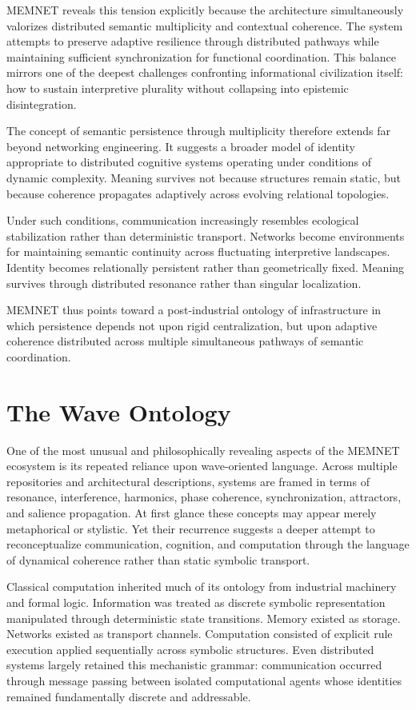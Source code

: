 \documentclass[11pt,a4paper]{article}
\begin{document}
MEMNET reveals this tension explicitly because the architecture simultaneously valorizes distributed semantic multiplicity and contextual coherence. The system attempts to preserve adaptive resilience through distributed pathways while maintaining sufficient synchronization for functional coordination. This balance mirrors one of the deepest challenges confronting informational civilization itself: how to sustain interpretive plurality without collapsing into epistemic disintegration.

The concept of semantic persistence through multiplicity therefore extends far beyond networking engineering. It suggests a broader model of identity appropriate to distributed cognitive systems operating under conditions of dynamic complexity. Meaning survives not because structures remain static, but because coherence propagates adaptively across evolving relational topologies.

Under such conditions, communication increasingly resembles ecological stabilization rather than deterministic transport. Networks become environments for maintaining semantic continuity across fluctuating interpretive landscapes. Identity becomes relationally persistent rather than geometrically fixed. Meaning survives through distributed resonance rather than singular localization.

MEMNET thus points toward a post-industrial ontology of infrastructure in which persistence depends not upon rigid centralization, but upon adaptive coherence distributed across multiple simultaneous pathways of semantic coordination.

\section{The Wave Ontology}

One of the most unusual and philosophically revealing aspects of the MEMNET ecosystem is its repeated reliance upon wave-oriented language. Across multiple repositories and architectural descriptions, systems are framed in terms of resonance, interference, harmonics, phase coherence, synchronization, attractors, and salience propagation. At first glance these concepts may appear merely metaphorical or stylistic. Yet their recurrence suggests a deeper attempt to reconceptualize communication, cognition, and computation through the language of dynamical coherence rather than static symbolic transport.

Classical computation inherited much of its ontology from industrial machinery and formal logic. Information was treated as discrete symbolic representation manipulated through deterministic state transitions. Memory existed as storage. Networks existed as transport channels. Computation consisted of explicit rule execution applied sequentially across symbolic structures. Even distributed systems largely retained this mechanistic grammar: communication occurred through message passing between isolated computational agents whose identities remained fundamentally discrete and addressable.
\end{document}
